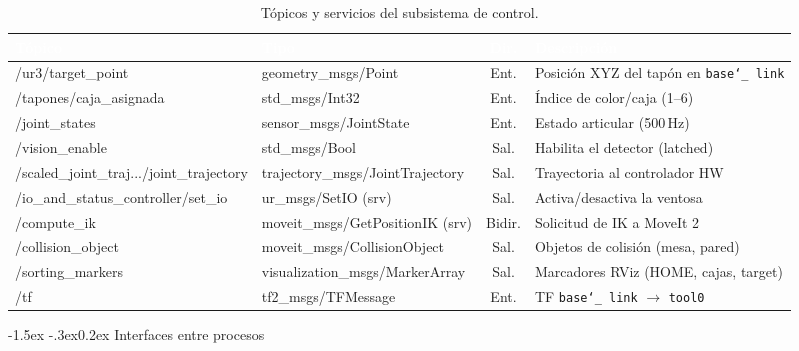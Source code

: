 \documentclass[12pt,a4paper]{article}
\makeatletter
\renewcommand\subsubsection{\@startsection{subsubsection}{3}{\z@}%
  {-1.5ex \@plus -.3ex}{0.2ex}%
  {\normalsize\bfseries\color{MediumBlue}}}
\newcommand{\rowA}{\rowcolor{LightGray}}
\newcommand{\rowB}{\rowcolor{white}}
\newcommand{\code}[1]{%
  \begingroup
  \def\_{\char`_\penalty0 }%
  \def\/{\char`/\penalty0 }%
  \texttt{\small #1}%
  \endgroup}
\makeatother
\begin{document}
\begin{table}[H]
\centering
\caption{Tópicos y servicios del subsistema de control.}
\label{tab:ctrl-topics}
\scriptsize
\renewcommand{\arraystretch}{1.25}
\begin{tabularx}{\textwidth}{|>{\ttfamily}l|>{\ttfamily}l|c|>{\RaggedRight\arraybackslash}X|}
  \hline
  \rowcolor{BlueHeader}
  \textcolor{white}{\bfseries Tópico} &
  \textcolor{white}{\bfseries Tipo} &
  \textcolor{white}{\bfseries Dir.} &
  \textcolor{white}{\bfseries Descripción} \\
  \hline
  \rowA /ur3/target\_point & geometry\_msgs/Point & Ent. & Posición XYZ del tapón en \code{base\_link} \\
  \rowB /tapones/caja\_asignada & std\_msgs/Int32 & Ent. & Índice de color/caja (1--6) \\
  \rowA /joint\_states & sensor\_msgs/JointState & Ent. & Estado articular (500\,Hz) \\
  \rowB /vision\_enable & std\_msgs/Bool & Sal. & Habilita el detector (latched) \\
  \rowA /scaled\_joint\_traj.../joint\_trajectory & trajectory\_msgs/JointTrajectory & Sal. & Trayectoria al controlador HW \\
  \rowB /io\_and\_status\_controller/set\_io & ur\_msgs/SetIO (srv) & Sal. & Activa/desactiva la ventosa \\
  \rowA /compute\_ik & moveit\_msgs/GetPositionIK (srv) & Bidir. & Solicitud de IK a MoveIt 2 \\
  \rowB /collision\_object & moveit\_msgs/CollisionObject & Sal. & Objetos de colisión (mesa, pared) \\
  \rowA /sorting\_markers & visualization\_msgs/MarkerArray & Sal. & Marcadores RViz (HOME, cajas, target) \\
  \rowB /tf & tf2\_msgs/TFMessage & Ent. & TF \code{base\_link}$\to$\code{tool0} \\
  \hline
\end{tabularx}
\end{table}

\subsubsection{Interfaces entre procesos}
\end{document}
